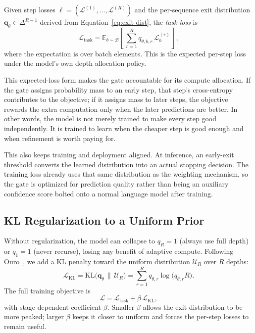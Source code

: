 \documentclass[11pt,a4paper]{article}
\begin{document}
Given step losses $\boldsymbol{\ell} = (\mathcal{L}^{(1)}, \ldots,
\mathcal{L}^{(R)})$ and the per-sequence exit distribution
$\mathbf{q}_{\theta} \in \Delta^{R-1}$ derived from
Equation~\ref{eq:exit-dist}, the \emph{task loss} is
\begin{equation}
\mathcal{L}_{\mathrm{task}} = \mathbb{E}_{b \sim \mathcal{B}} \left[\, \sum_{r=1}^{R} q_{\theta,b,r}\, \mathcal{L}^{(r)}_b\, \right],
\end{equation}
where the expectation is over batch elements. This is the expected per-step
loss under the model's own depth allocation policy.

This expected-loss form makes the gate accountable for its compute allocation.
If the gate assigns probability mass to an early step, that step's
cross-entropy contributes to the objective; if it assigns mass to later steps,
the objective rewards the extra computation only when the later predictions are
better. In other words, the model is not merely trained to make every step good
independently. It is trained to learn when the cheaper step is good enough and
when refinement is worth paying for.

This also keeps training and deployment aligned. At inference, an early-exit
threshold converts the learned distribution into an actual stopping decision.
The training loss already uses that same distribution as the weighting mechanism,
so the gate is optimized for prediction quality rather than being an auxiliary
confidence score bolted onto a normal language model after training.

\subsection{KL Regularization to a Uniform Prior}

Without regularization, the model can collapse to $q_R = 1$ (always use full
depth) or $q_1 = 1$ (never recurse), losing any benefit of adaptive compute.
Following Ouro~\cite{ouro2025}, we add a KL penalty toward the uniform
distribution $\mathcal{U}_R$ over $R$ depths:
\begin{equation}
\mathcal{L}_{\mathrm{KL}} = \mathrm{KL}\bigl(\mathbf{q}_{\theta}\,\|\, \mathcal{U}_R\bigr)
= \sum_{r=1}^{R} q_{\theta,r} \log \bigl( q_{\theta,r} R\bigr).
\end{equation}
The full training objective is
\begin{equation}
\mathcal{L} = \mathcal{L}_{\mathrm{task}} + \beta\, \mathcal{L}_{\mathrm{KL}},
\label{eq:ouro-loss}
\end{equation}
with stage-dependent coefficient $\beta$. Smaller $\beta$ allows the exit
distribution to be more peaked; larger $\beta$ keeps it closer to uniform
and forces the per-step losses to remain useful.
\end{document}
